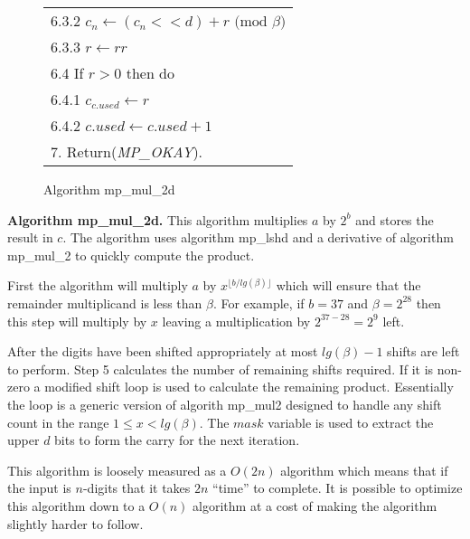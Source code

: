 \documentclass[b5paper]{book}
\begin{document}
\begin{figure}[!here]
\begin{small}
\begin{center}
\begin{tabular}{l}
\hspace{6mm}6.3.2  $c_n \leftarrow (c_n << d) + r \mbox{ (mod }\beta\mbox{)}$ \\
\hspace{6mm}6.3.3  $r \leftarrow rr$ \\
\hspace{3mm}6.4  If $r > 0$ then do \\
\hspace{6mm}6.4.1  $c_{c.used} \leftarrow r$ \\
\hspace{6mm}6.4.2  $c.used \leftarrow c.used + 1$ \\
7.  Return(\textit{MP\_OKAY}). \\
\hline
\end{tabular}
\end{center}
\end{small}
\caption{Algorithm mp\_mul\_2d}
\end{figure}

\textbf{Algorithm mp\_mul\_2d.}
This algorithm multiplies $a$ by $2^b$ and stores the result in $c$.  The algorithm uses algorithm mp\_lshd and a derivative of algorithm mp\_mul\_2 to
quickly compute the product.

First the algorithm will multiply $a$ by $x^{\lfloor b / lg(\beta) \rfloor}$ which will ensure that the remainder multiplicand is less than 
$\beta$.  For example, if $b = 37$ and $\beta = 2^{28}$ then this step will multiply by $x$ leaving a multiplication by $2^{37 - 28} = 2^{9}$ 
left.

After the digits have been shifted appropriately at most $lg(\beta) - 1$ shifts are left to perform.  Step 5 calculates the number of remaining shifts 
required.  If it is non-zero a modified shift loop is used to calculate the remaining product.  
Essentially the loop is a generic version of algorith mp\_mul2 designed to handle any shift count in the range $1 \le x < lg(\beta)$.  The $mask$
variable is used to extract the upper $d$ bits to form the carry for the next iteration.  

This algorithm is loosely measured as a $O(2n)$ algorithm which means that if the input is $n$-digits that it takes $2n$ ``time'' to 
complete.  It is possible to optimize this algorithm down to a $O(n)$ algorithm at a cost of making the algorithm slightly harder to follow.
\end{document}
